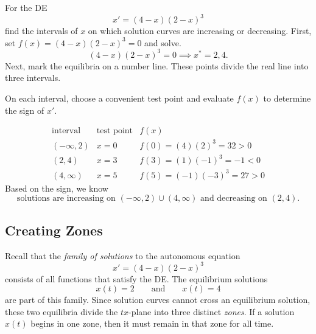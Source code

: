 \documentclass[09pt,letterpaper]{article}
\begin{document}
\begin{example}[1]{
For the DE 
$$
x' = (4-x)(2-x)^3
$$
find the intervals of $x$ on which solution curves are increasing or decreasing.
}
First, set $f(x)=(4-x)(2-x)^3=0$ and solve. 
$$
(4-x)(2-x)^3=0 \implies x^*=2,4.
$$
Next, mark the equilibria on a number line. These points divide the real line into three intervals.

\begin{figure}[H]
    \centering
{}
\end{figure}
On each interval, choose a convenient test point and evaluate $f(x)$ to determine the sign of $x'$.

\[
\begin{array}{c|c|c}
\text{interval} & \text{test point} & f(x) \\
\hline
(-\infty,2) & x=0 & f(0)=(4)(2)^3=32>0 \\
(2,4) & x=3 & f(3)=(1)(-1)^3=-1<0 \\
(4,\infty) & x=5 & f(5)=(-1)(-3)^3=27>0
\end{array}
\]    
Based on the sign, we know 
\[
\boxed{
\text{solutions are increasing on }(-\infty,2)\cup(4,\infty)
\text{ and decreasing on }(2,4).
}
\]
\end{example}

\subsection{Creating Zones}
Recall that the \textit{family of solutions} to the autonomous equation
\[
x' = (4-x)(2-x)^3
\]
consists of all functions that satisfy the DE. The equilibrium solutions
\[
x(t)=2
\qquad \text{and} \qquad
x(t)=4
\]
are part of this family. Since solution curves cannot cross an equilibrium solution, these two equilibria divide the $tx$-plane into three distinct \textit{zones}. If a solution $x(t)$ begins in one zone, then it must remain in that zone for all time.
\end{document}
